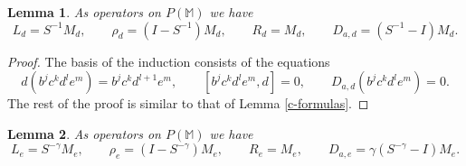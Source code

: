 \documentclass{amsart}
\theoremstyle{plain}
\newtheorem{lemma}{Lemma}[section]
\theoremstyle{definition}
\begin{document}
\begin{lemma} \label{d-formulas}
As operators on $P(\mathbb{M})$ we have
  \[
  L_d
  =
  S^{-1} M_d,
  \qquad
  \rho_d
  =
  ( I - S^{-1} ) M_d,
  \qquad
  R_d
  =
  M_d,
  \qquad
  D_{a,d}
  =
  ( S^{-1} - I ) M_d.
  \]
\end{lemma}

\begin{proof}
The basis of the induction consists of the equations
  \[
  d ( b^j c^k d^l e^m ) = b^j c^k d^{l+1} e^m,
  \qquad
  [ b^j c^k d^l e^m, d ] = 0,
  \qquad
  D_{a,d} ( b^j c^k d^l e^m ) = 0.
  \]
The rest of the proof is similar to that of Lemma \ref{c-formulas}.
\end{proof}

\begin{lemma} \label{e-formulas}
As operators on $P(\mathbb{M})$ we have
  \[
  L_e
  =
  S^{-\gamma} M_e,
  \qquad
  \rho_e
  =
  ( I - S^{-\gamma} ) M_e,
  \qquad
  R_e
  =
  M_e,
  \qquad
  D_{a,e}
  =
  \gamma ( S^{-\gamma} - I ) M_e.
  \]
\end{lemma}
\end{document}
